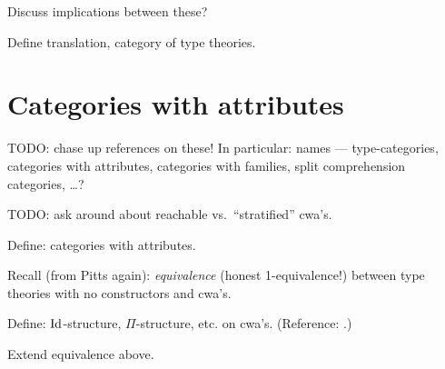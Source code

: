 Discuss implications between these?

 \label{para:translations}

Define translation, category of type theories.

\section{Categories with attributes}

TODO: chase up references on these!  In particular: names --- type-categories, categories with attributes, categories with families, split comprehension categories, \ldots ?

TODO: ask around about reachable vs.\ ``stratified'' cwa's.


Define: categories with attributes.  \cite[\S 6.4]{pitts:categorical-logic}

Recall (from Pitts again): \emph{equivalence} (honest 1-equivalence!) between type theories with no constructors and cwa's.

Define: $\mathrm{Id}$-structure, $\Pi$-structure, etc. on cwa's.  (Reference: \cite{awodey-warren}.)

Extend equivalence above.



% 




